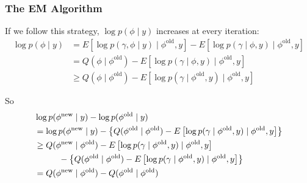 \documentclass{beamer}
\begin{document}
\begin{frame}
\frametitle{The EM Algorithm}

If we follow this strategy, $\log p(\phi \mid y)$ increases at every iteration:
\begin{align*}
\log p(\phi \mid y) &=  E\left[ \log p(\gamma, \phi \mid y) \mid \phi^{\text{old}}, y \right] - E\left[\log p(\gamma \mid \phi, y) \mid \phi^{\text{old}}, y \right]\\
&= Q(\phi \mid \phi^{\text{old}}) - E\left[\log p(\gamma \mid \phi, y) \mid \phi^{\text{old}}, y \right] \tag{defn. Q} \\
&\ge Q(\phi \mid \phi^{\text{old}}) - E\left[\log p(\gamma \mid \phi^{\text{old}}, y) \mid \phi^{\text{old}}, y \right] \tag{HW}
\end{align*}
\pause

So 
\begin{align*}
&\log p(\phi^{\text{new}} \mid y) - \log p(\phi^{\text{old}} \mid y) \\
&= \log p(\phi^{\text{new}} \mid y) - \left\{Q(\phi^{\text{old}} \mid \phi^{\text{old}}) - E\left[\log p(\gamma \mid \phi^{\text{old}}, y) \mid \phi^{\text{old}}, y \right] \right\} \\
&\ge Q(\phi^{\text{new}} \mid \phi^{\text{old}}) - E\left[\log p(\gamma \mid \phi^{\text{old}}, y) \mid \phi^{\text{old}}, y \right] \\
&\hspace{10mm} - \left\{Q(\phi^{\text{old}} \mid \phi^{\text{old}}) - E\left[\log p(\gamma \mid \phi^{\text{old}}, y) \mid \phi^{\text{old}}, y \right] \right\} \\
&= Q(\phi^{\text{new}} \mid \phi^{\text{old}}) - Q(\phi^{\text{old}} \mid \phi^{\text{old}})
\end{align*}

\end{frame}
\end{document}
